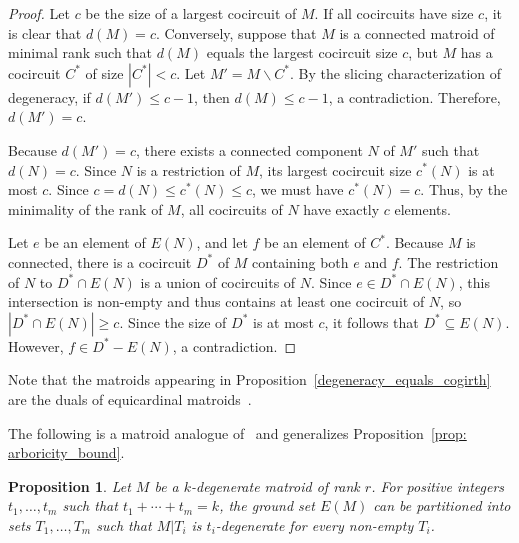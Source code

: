 \documentclass{amsart}
\newcommand{\ba}{\backslash}
\newtheorem{proposition}[theorem]{Proposition}
\theoremstyle{definition}
\theoremstyle{remark}
\numberwithin{equation}{section}
\begin{document}
\begin{proof}
Let $c$ be the size of a largest cocircuit of $M$. If all cocircuits have size $c$, it is clear that $d(M)=c$. Conversely, suppose that $M$ is a connected matroid of minimal rank such that $d(M)$ equals the largest cocircuit size $c$, but $M$ has a cocircuit $C^*$ of size $|C^*| < c$. Let $M' = M \ba C^*$. By the slicing characterization of degeneracy, if $d(M') \le c-1$, then $d(M) \le c-1$, a contradiction. Therefore, $d(M') = c$.

Because $d(M') = c$, there exists a connected component $N$ of $M'$ such that $d(N) = c$. Since $N$ is a restriction of $M$, its largest cocircuit size $c^*(N)$ is at most $c$. Since $c = d(N) \le c^*(N) \le c$, we must have $c^*(N) = c$. Thus, by the minimality of the rank of $M$, all cocircuits of $N$ have exactly $c$ elements. 

Let $e$ be an element of $E(N)$, and let $f$ be an element of $C^*$. Because $M$ is connected, there is a cocircuit $D^*$ of $M$ containing both $e$ and $f$. The restriction of $N$ to $D^* \cap E(N)$ is a union of cocircuits of $N$. Since $e \in D^* \cap E(N)$, this intersection is non-empty and thus contains at least one cocircuit of $N$, so $|D^* \cap E(N)| \geq c$. Since the size of $D^*$ is at most $c$, it follows that $D^* \subseteq E(N)$. However, $f \in D^* - E(N)$, a contradiction. 
\end{proof}

Note that the matroids appearing in Proposition~\ref{degeneracy_equals_cogirth} are the duals of equicardinal matroids~\cite{murty_71}.

The following is a matroid analogue of~\cite[Theorem~69]{bickle} and generalizes
Proposition~\ref{prop: arboricity_bound}. 

\begin{proposition}
\label{arboricity_general}
Let $M$ be a $k$-degenerate matroid of rank $r$. For positive integers $t_1, \ldots, t_m$ such that $t_1 + \cdots + t_m = k$, the ground set $E(M)$ can be partitioned into sets $T_1, \ldots, T_m$ such that $M|T_i$ is $t_i$-degenerate for every non-empty $T_i$. 
\end{proposition}
\end{document}
